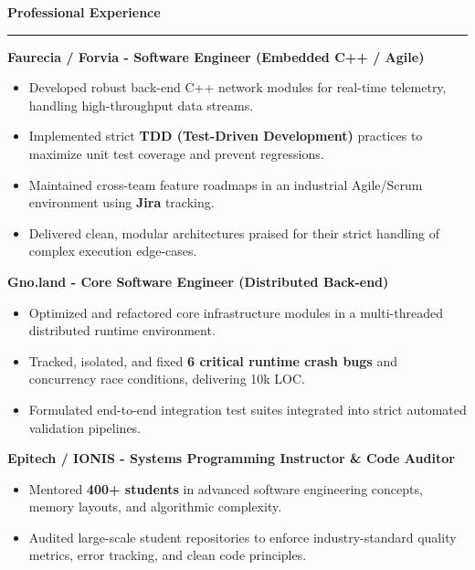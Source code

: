 \documentclass[9pt]{extarticle}
\begin{document}
\par\vspace{5pt}

{\large\bfseries Professional Experience}
\par\vspace{-8pt}
\rule{\linewidth}{0.4pt}
\par\vspace{5pt}

{\bfseries Faurecia / Forvia - Software Engineer (Embedded C++ / Agile)}
\begin{itemize}[noitemsep, topsep=0pt]
    \item Developed robust back-end C++ network modules for real-time telemetry, handling high-throughput data streams.
    \item Implemented strict {\bfseries TDD (Test-Driven Development)} practices to maximize unit test coverage and prevent regressions.
    \item Maintained cross-team feature roadmaps in an industrial Agile/Scrum environment using {\bfseries Jira} tracking.
    \item Delivered clean, modular architectures praised for their strict handling of complex execution edge-cases.
\end{itemize}

\par\vspace{5pt}

{\bfseries Gno.land - Core Software Engineer (Distributed Back-end)}
\begin{itemize}[noitemsep, topsep=0pt]
    \item Optimized and refactored core infrastructure modules in a multi-threaded distributed runtime environment.
    \item Tracked, isolated, and fixed {\bfseries 6 critical runtime crash bugs} and concurrency race conditions, delivering 10k LOC.
    \item Formulated end-to-end integration test suites integrated into strict automated validation pipelines.
\end{itemize}

\par\vspace{5pt}

{\bfseries Epitech / IONIS - Systems Programming Instructor \& Code Auditor}
\begin{itemize}[noitemsep, topsep=0pt]
    \item Mentored {\bfseries 400+ students} in advanced software engineering concepts, memory layouts, and algorithmic complexity.
    \item Audited large-scale student repositories to enforce industry-standard quality metrics, error tracking, and clean code principles.
\end{itemize}
\end{document}
